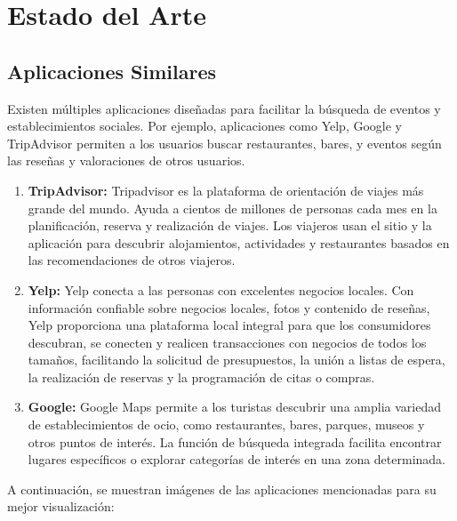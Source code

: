 \chapter{Estado del Arte}
\section{Aplicaciones Similares}

Existen múltiples aplicaciones diseñadas para facilitar la búsqueda de eventos y establecimientos sociales. Por
ejemplo, aplicaciones como Yelp, Google y TripAdvisor permiten a los usuarios buscar restaurantes, bares, y eventos
según las reseñas y valoraciones de otros usuarios.

\begin{enumerate}
    \item \textbf{TripAdvisor:} Tripadvisor es la plataforma de orientación de viajes más grande del mundo. Ayuda a
          cientos de millones de personas cada mes en la planificación, reserva y realización de viajes. Los viajeros usan
          el sitio y la aplicación para descubrir alojamientos, actividades y restaurantes basados en las recomendaciones
          de otros viajeros.\cite{tripadvisor}

    \item \textbf{Yelp:} Yelp conecta a las personas con excelentes negocios locales. Con información confiable
          sobre negocios locales, fotos y contenido de reseñas, Yelp proporciona una plataforma local integral para que
          los consumidores descubran, se conecten y realicen transacciones con negocios de todos los tamaños, facilitando
          la solicitud de presupuestos, la unión a listas de espera, la realización de reservas y la programación de citas
          o compras.\cite{yelp}

    \item \textbf{Google:} Google Maps permite a los turistas descubrir una amplia variedad de establecimientos de
          ocio, como restaurantes, bares, parques, museos y otros puntos de interés. La función de búsqueda integrada
          facilita encontrar lugares específicos o explorar categorías de interés en una zona determinada.\cite{google}

\end{enumerate}

A continuación, se muestran imágenes de las aplicaciones mencionadas para su mejor visualización:

